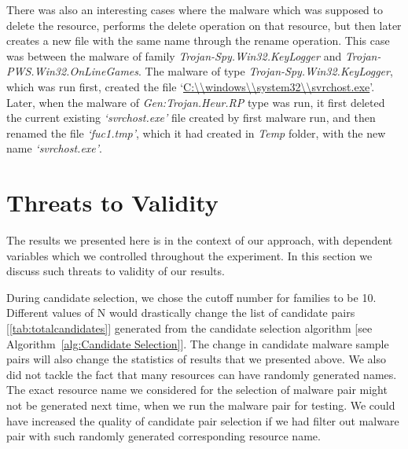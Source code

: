 There was also an interesting cases where the malware which was supposed to delete the resource, performs the delete operation on that resource, but then later creates a new file with the same name through the rename operation.
This case was between the malware of family \emph{Trojan-Spy.Win32.KeyLogger} and \emph{Trojan-PWS.Win32.OnLineGames}.
The malware of type \emph{Trojan-Spy.Win32.KeyLogger}, which was run first, created the file `\url{C:\\windows\\system32\\svrchost.exe}'. %
Later, when the malware of \emph{Gen:Trojan.Heur.RP} type was run, it first deleted the current existing \emph{`svrchost.exe'} file created by first malware run, and then renamed the file \emph{`fuc1.tmp'}, which it had created in \emph{Temp} folder, with the new name \emph{`svrchost.exe'}.\\

\section{Threats to Validity}
\label{sec:Threats to Validity}
The results we presented here is in the context of our approach, with dependent variables which we controlled throughout the experiment.
In this section we discuss such threats to validity of our results.

During candidate selection, we chose the cutoff number for families to be 10.
Different values of N would drastically change the list of candidate pairs [\autoref{tab:totalcandidates}] generated from the candidate selection algorithm [see Algorithm~\autoref{alg:Candidate Selection}].
The change in candidate malware sample pairs will also change the statistics of results that we presented above.
We also did not tackle the fact that many resources can have randomly generated names.
The exact resource name we considered for the selection of malware pair might not be generated next time, when we run the malware pair for testing.
We could have increased the quality of candidate pair selection if we had filter out malware pair with such randomly generated corresponding resource name.

